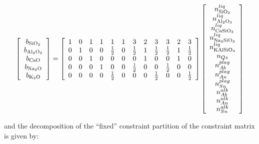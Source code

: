\documentclass[11pt, titlepage, twoside]{article}
\begin{document}
\begin{MPEquation}[!ht]
\begin{equation}
\left[ {\begin{array}{*{20}{c}}
{{b_{{\rm{Si}}{{\rm{O}}_2}}}}\\
{{b_{{\rm{A}}{{\rm{l}}_2}{{\rm{O}}_3}}}}\\
{{b_{{\rm{CaO}}}}}\\
{{b_{{\rm{N}}{{\rm{a}}_2}{\rm{O}}}}}\\
{{b_{{{\rm{K}}_2}{\rm{O}}}}}
\end{array}} \right] = \left[ {\begin{array}{*{20}{c}}
1&0&1&1&1&1&3&2&3&3&2&3\\
0&1&0&0&{\frac{1}{2}}&0&{\frac{1}{2}}&1&{\frac{1}{2}}&{\frac{1}{2}}&1&{\frac{1}{2}}\\
0&0&1&0&0&0&0&1&0&0&1&0\\
0&0&0&1&0&0&{\frac{1}{2}}&0&0&{\frac{1}{2}}&0&0\\
0&0&0&0&{\frac{1}{2}}&0&0&0&{\frac{1}{2}}&0&0&{\frac{1}{2}}
\end{array}} \right]\left[ {\begin{array}{*{20}{c}}
{n_{{\rm{Si}}{{\rm{O}}_2}}^{liq}}\\
{n_{{\rm{A}}{{\rm{l}}_2}{{\rm{O}}_3}}^{liq}}\\
{n_{{\rm{CaSi}}{{\rm{O}}_3}}^{liq}}\\
{n_{{\rm{N}}{{\rm{a}}_2}{\rm{Si}}{{\rm{O}}_3}}^{liq}}\\
{n_{{\rm{KAlSi}}{{\rm{O}}_4}}^{liq}}\\
{{n_{Qz}}}\\
{n_{Ab}^{plag}}\\
{n_{An}^{plag}}\\
{n_{Sn}^{plag}}\\
{n_{Ab}^{alk}}\\
{n_{An}^{alk}}\\
{n_{Sn}^{alk}}
\end{array}} \right]
\end{equation}
\label{MPEquationElement:B41655A5-BBB9-4A1B-A06A-3506C9B300D8}
\end{MPEquation}
and the decomposition of the ``fixed'' constraint partition of the constraint matrix is given by:
\end{document}
